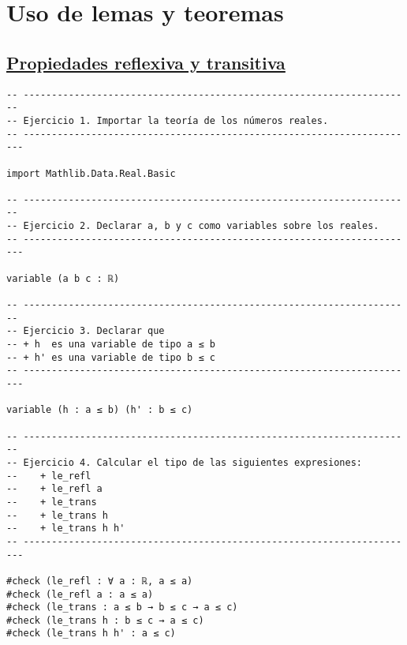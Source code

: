 \section{Uso de lemas y teoremas}
\label{sec:org052d042}

\subsection{\href{./src/Basicos/Propiedades\_reflexiva\_y\_transitiva.lean}{Propiedades reflexiva y transitiva}}
\label{sec:orgc697ea9}
\begin{verbatim}
-- ---------------------------------------------------------------------
-- Ejercicio 1. Importar la teoría de los números reales.
-- ----------------------------------------------------------------------

import Mathlib.Data.Real.Basic

-- ---------------------------------------------------------------------
-- Ejercicio 2. Declarar a, b y c como variables sobre los reales.
-- ----------------------------------------------------------------------

variable (a b c : ℝ)

-- ---------------------------------------------------------------------
-- Ejercicio 3. Declarar que
-- + h  es una variable de tipo a ≤ b
-- + h' es una variable de tipo b ≤ c
-- ----------------------------------------------------------------------

variable (h : a ≤ b) (h' : b ≤ c)

-- ---------------------------------------------------------------------
-- Ejercicio 4. Calcular el tipo de las siguientes expresiones:
--    + le_refl
--    + le_refl a
--    + le_trans
--    + le_trans h
--    + le_trans h h'
-- ----------------------------------------------------------------------

#check (le_refl : ∀ a : ℝ, a ≤ a)
#check (le_refl a : a ≤ a)
#check (le_trans : a ≤ b → b ≤ c → a ≤ c)
#check (le_trans h : b ≤ c → a ≤ c)
#check (le_trans h h' : a ≤ c)
\end{verbatim}

